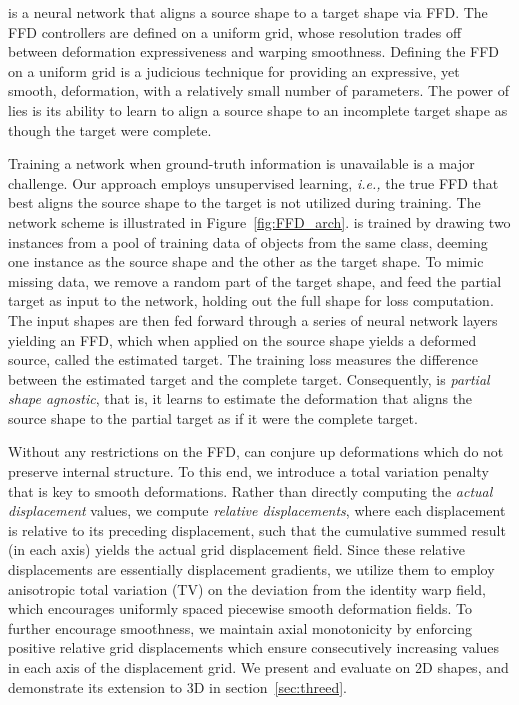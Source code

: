 \documentclass[acmtog,timestamp]{acmart}%
\begin{document}
\begin{comment}
3. The regularizations and any additions on the Vanilla scheme
\end{comment}\ourmethod{} is a neural network that aligns a source shape to a target shape via FFD. The FFD controllers are defined on a uniform grid, whose resolution trades off between deformation expressiveness and warping smoothness. Defining the FFD on a uniform grid is a judicious technique for providing an expressive, yet smooth, deformation, with a relatively small number of parameters. The power of \ourmethod{} lies is its ability to learn to align a source shape to an incomplete target shape as though the target were complete.

Training a network when ground-truth information is unavailable is a major challenge.
Our approach employs unsupervised learning, \emph{i.e.,} the true FFD that best aligns the source shape to the target is not utilized during training. The network scheme is illustrated in Figure~\ref{fig:FFD_arch}. \ourmethod{} is trained by drawing two instances from a pool of training data of objects from the same class, deeming one instance as the source shape and the other as the target shape. To mimic missing data, we remove a random part of the target shape, and feed the partial target as input to the network, holding out the full shape for loss computation. The input shapes are then fed forward through a series of neural network layers yielding an FFD, which when applied on the source shape yields a deformed source, called the estimated target. The training loss measures the difference between the estimated target and the complete target. Consequently, \ourmethod{} is \emph{partial shape agnostic}, that is, it learns to estimate the deformation that aligns the source shape to the partial target as if it were the complete target.

Without any restrictions on the FFD, \ourmethod{} can conjure up deformations which do not preserve internal structure. 
To this end, we introduce a total variation penalty that is key to 
smooth deformations.
Rather than directly computing the \emph{actual displacement} values, we compute \emph{relative displacements}, where each displacement is relative to its preceding displacement, such that the cumulative summed result (in each axis) yields the actual grid displacement field.
Since these relative displacements are essentially displacement gradients, we utilize them to employ anisotropic total variation (TV) on the deviation from the identity warp field, which encourages uniformly spaced piecewise smooth deformation fields.
To further encourage smoothness, we maintain axial monotonicity by enforcing positive relative grid displacements which ensure consecutively increasing values in each axis of the displacement grid.
We present and evaluate \ourmethod{} on 2D shapes, and demonstrate its extension to 3D in section~\ref{sec:threed}.
\end{document}
